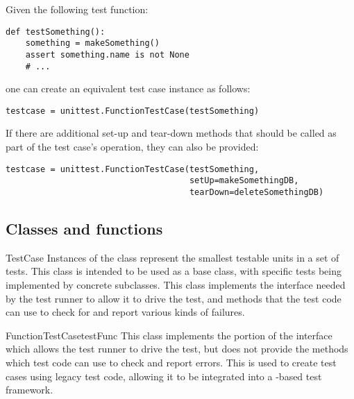 Given the following test function:

\begin{verbatim}
def testSomething():
    something = makeSomething()
    assert something.name is not None
    # ...
\end{verbatim}

one can create an equivalent test case instance as follows:

\begin{verbatim}
testcase = unittest.FunctionTestCase(testSomething)
\end{verbatim}

If there are additional set-up and tear-down methods that should be
called as part of the test case's operation, they can also be provided:

\begin{verbatim}
testcase = unittest.FunctionTestCase(testSomething,
                                     setUp=makeSomethingDB,
                                     tearDown=deleteSomethingDB)
\end{verbatim}



\subsection{Classes and functions
            \label{unittest-contents}}

\begin{classdesc}{TestCase}{}
  Instances of the  class represent the smallest
  testable units in a set of tests.  This class is intended to be used
  as a base class, with specific tests being implemented by concrete
  subclasses.  This class implements the interface needed by the test
  runner to allow it to drive the test, and methods that the test code
  can use to check for and report various kinds of failures.
\end{classdesc}

\begin{classdesc}{FunctionTestCase}{testFunc}
  This class implements the portion of the  interface
  which allows the test runner to drive the test, but does not provide
  the methods which test code can use to check and report errors.
  This is used to create test cases using legacy test code, allowing
  it to be integrated into a -based test
  framework.
\end{classdesc}

